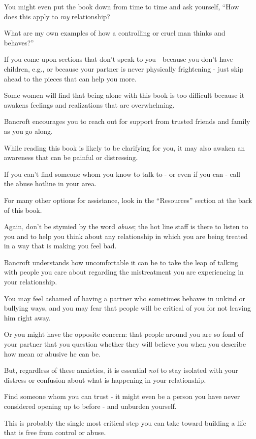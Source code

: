 \documentclass[oneside]{article}
\numberwithin{equation}{section}
\begin{document}
You might even put the book down from time to time and ask yourself, ``How does this apply to \textit{my} relationship?

What are my own examples of how a controlling or cruel man thinks and behaves?''

If you come upon sections that don't speak to you - because you don't have children, e.g., or because your partner is never physically frightening - just skip ahead to the pieces that can help you more.

%
Some women will find that being alone with this book is too difficult because it awakens feelings and realizations that are overwhelming.

Bancroft encourages you to reach out for support from trusted friends and family as you go along.

While reading this book is likely to be clarifying for you, it may also awaken an awareness that can be painful or distressing.

%
If you can't find someone whom you know to talk to - or even if you can - call the abuse hotline in your area.

For many other options for assistance, look in the ``Resources'' section at the back of this book.

Again, don't be stymied by the word \textit{abuse}; the hot line staff is there to listen to you and to help you think about any relationship in which you are being treated in a way that is making you feel bad.

%
Bancroft understands how uncomfortable it can be to take the leap of talking with people you care about regarding the mistreatment you are experiencing in your relationship.

You may feel ashamed of having a partner who sometimes behaves in unkind or bullying ways, and you may fear that people will be critical of you for not leaving him right away.

Or you might have the opposite concern: that people around you are so fond of your partner that you question whether they will believe you when you describe how mean or abusive he can be.

But, regardless of these anxieties, it is essential \textit{not} to stay isolated with your distress or confusion about what is happening in your relationship.

Find someone whom you can trust - it might even be a person you have never considered opening up to before - and unburden yourself.

This is probably the single most critical step you can take toward building a life that is free from control or abuse.
\end{document}
